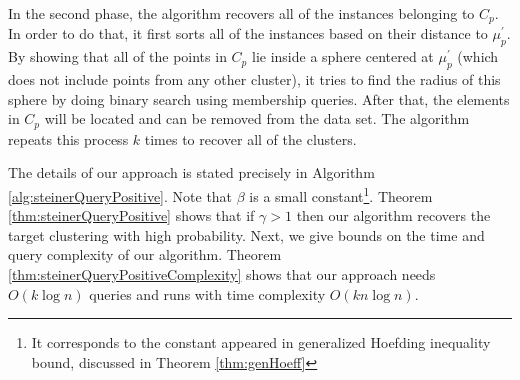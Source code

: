 \documentclass[orivec]{llncs}
\begin{document}
In the second phase, the algorithm recovers all of the instances belonging to $C_p$. In order to do that, it first sorts all of the instances based on their distance to $\mu_p^\prime$. By showing that all of the points in $C_p$ lie inside a sphere centered at $\mu_p^\prime$ (which does not include points from any other cluster), it tries to find the radius of this sphere by doing binary search using membership queries. After that, the elements in $C_p$ will be located and can be removed from the data set. The algorithm repeats this process $k$ times to recover all of the clusters.



The details of our approach is stated precisely in Algorithm \ref{alg:steinerQueryPositive}. Note that $\beta$ is a small constant\footnote{It corresponds to the constant appeared in generalized Hoefding inequality bound, discussed in Theorem \ref{thm:genHoeff}}. Theorem \ref{thm:steinerQueryPositive} shows that if $\gamma > 1$ then our algorithm recovers the target clustering with high probability. Next, we give bounds on the time and query complexity of our algorithm. Theorem \ref{thm:steinerQueryPositiveComplexity} shows that our approach needs $O(k\log n)$ queries and runs with time complexity $O(kn\log n)$.
\end{document}
